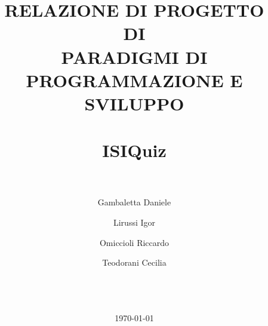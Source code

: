 \documentclass{report}
\title{\LARGE
    RELAZIONE DI PROGETTO  \\ DI \\ PARADIGMI DI PROGRAMMAZIONE E SVILUPPO \\
    \hrulefill \\
    \textbf{ISIQuiz} \\ 
    \hrulefill \\
}
\author{
    Gambaletta Daniele \\ \emailaddr{daniele.gambaletta@studio.unibo.it}
    \and
    Lirussi Igor \\ \emailaddr{igor.lirussi@studio.unibo.it}
    \and 
    Omiccioli Riccardo \\ \emailaddr{riccardo.omiccioli@studio.unibo.it} 
    \and 
    Teodorani Cecilia \\ \emailaddr{cecilia.teodorani@studio.unibo.it} 
    \\ \\ \\ 
}
\date{\today}
\begin{document}
\renewcommand{\labelenumii}{\arabic{enumi}.\arabic{enumii}}
\renewcommand{\labelenumiii}{\arabic{enumi}.\arabic{enumii}.\arabic{enumiii}}
\renewcommand{\labelenumiv}{\arabic{enumi}.\arabic{enumii}.\arabic{enumiii}.\arabic{enumiv}}

\maketitle

\tableofcontents

    
    
    
    
    
    
    
    
    
    
    


\nocite{*} %
\printbibliography[title={Bibliografia completa}]
\end{document}
